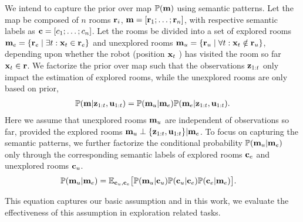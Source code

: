 % 

We intend to capture the prior over map $\mathbb{P}(\mathbf{m})$ using semantic patterns. Let the
map be composed of $n$ rooms $\mathbf{r}_i $, $\mathbf{m} = [\mathbf{r}_1; \dots; \mathbf{r}_n]$,
with respective semantic labels as $\mathbf{c} = [c_1; \dots; c_n]$.
Let the rooms be divided into a set of explored rooms $\mathbf{m}_e = \{ \mathbf{r}_e \mid
\exists t : \mathbf{x}_t \in \mathbf{r}_e \}$ and unexplored
rooms $\mathbf{m}_u = \{ \mathbf{r}_u \mid \forall t : \mathbf{x}_t \notin \mathbf{r}_u \}$, depending
upon whether the robot (position $\mathbf{x}_t$ ) has visited the room so far $\mathbf{x}_t
\in \mathbf{r}$.
We factorize the prior over map such that the observations $\mathbf{z}_{1:t}$ only
impact the estimation of explored rooms, while the unexplored rooms are only
based on prior,
\begin{align}
  \mathbb{P}(\mathbf{m} | \mathbf{z}_{1:t}, \mathbf{u}_{1:t}) = \mathbb{P}(\mathbf{m}_u | \mathbf{m}_e) \mathbb{P}(\mathbf{m}_e | \mathbf{z}_{1:t}, \mathbf{u}_{1:t}).
\end{align}
Here we assume that unexplored rooms $\mathbf{m}_u$ are independent of observations so
far, provided the explored rooms $ \mathbf{m}_u \perp \{ \mathbf{z}_{1:t}, \mathbf{u}_{1:t} \} | \mathbf{m}_e$.
To focus on capturing the semantic patterns, we further factorize the
conditional probability $\mathbb{P}(\mathbf{m}_u | \mathbf{m}_e)$ only through the corresponding
semantic labels of explored rooms $\mathbf{c}_e$ and unexplored rooms $\mathbf{c}_u$.
\begin{align}
  \mathbb{P}(\mathbf{m}_u | \mathbf{m}_e) &= \mathbb{E}_{\mathbf{c}_u, \mathbf{c}_e} \big[
  \mathbb{P}(\mathbf{m}_u | \mathbf{c}_u) \mathbb{P}(\mathbf{c}_u|\mathbf{c}_e) \mathbb{P}(\mathbf{c}_e | \mathbf{m}_e)
  \big].
\end{align}

This equation captures our basic assumption and in this work, we evaluate the
effectiveness of this assumption in exploration related tasks.